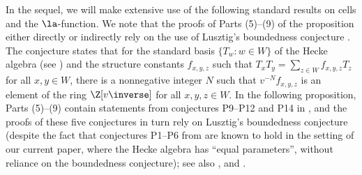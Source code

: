 In the sequel, we will make extensive use of the following standard results on cells and the
$\la$-function. We note that the proofs of Parts (5)--(9) of the proposition either directly or
indirectly rely on the use of Lusztig's boundedness conjecture \cite[\S 13.4]{LusztigHecke}. The
conjecture states that for the standard basis $\{T_w:w\in W\}$ of the Hecke algebra (see \cite[\S
2.2]{XuSubregular}) and the structure constants $f_{x,y,z}$ such that $T_xT_y=\sum_{z\in
W}f_{x,y,z}T_z$ for all $x,y\in W$, there is a nonnegative integer $N$ such that $v^{-N}f_{x,y,z}$
is an element of the ring $\Z[v\inverse]$ for all $x,y,z\in W$.  In the following proposition, Parts
(5)--(9) contain statements from conjectures P9--P12 and P14 in \cite[\S 14]{LusztigHecke}, and the
proofs of these five conjectures in turn rely on Lusztig's boundedness conjecture (despite the fact
    that conjectures P1--P6 from \cite[\S 14]{LusztigHecke} are known to hold in the setting of our
current paper, where the Hecke algebra has ``equal parameters'', without reliance on the boundedness
conjecture); see also \cite[\S 15.1]{LusztigHecke}, \cite[\S 14.3]{BonnafeCells} and \cite[Theorem
15.2.5]{BonnafeCells}.

